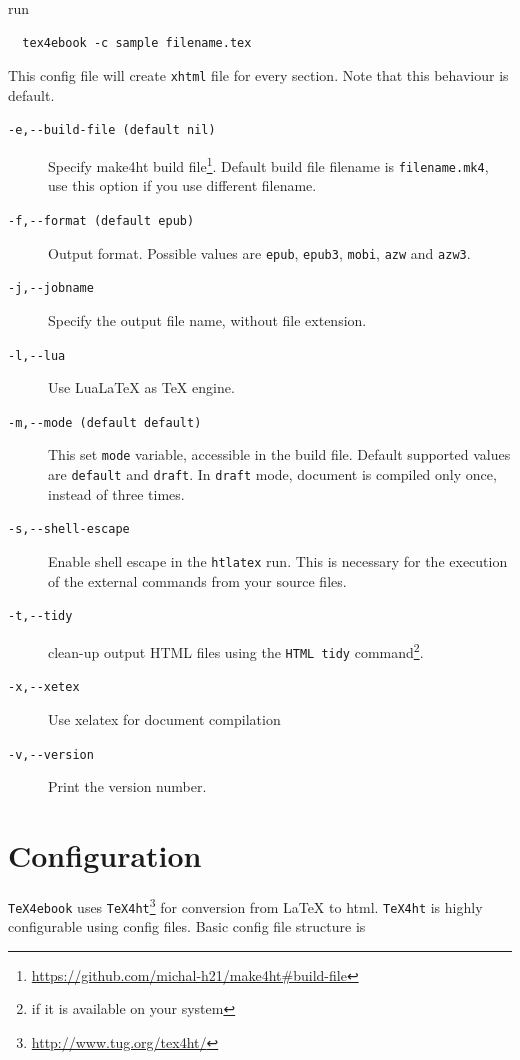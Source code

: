 run

\begin{verbatim}
  tex4ebook -c sample filename.tex
\end{verbatim}

This config file will create \texttt{xhtml} file for every section. Note
that this behaviour is default.

\begin{description}
\item[\texttt{-e,-\/-build-file\ (default\ nil)}]
Specify make4ht build file\footnote{\url{https://github.com/michal-h21/make4ht\#build-file}}.
Default build file filename is \texttt{filename.mk4}, use this option if
you use different filename.
\item[\texttt{-f,-\/-format\ (default\ epub)}]
Output format. Possible values are \texttt{epub}, \texttt{epub3},
\texttt{mobi}, \texttt{azw} and \texttt{azw3}.
\item[\texttt{-j,-\/-jobname}]
Specify the output file name, without file extension.
\item[\texttt{-l,-\/-lua}]
Use LuaLaTeX as TeX engine.
\item[\texttt{-m,-\/-mode\ (default\ default)}]
This set \texttt{mode} variable, accessible in the build file. Default
supported values are \texttt{default} and \texttt{draft}. In
\texttt{draft} mode, document is compiled only once, instead of three
times.
\item[\texttt{-s,-\/-shell-escape}]
Enable shell escape in the \texttt{htlatex} run. This is necessary for
the execution of the external commands from your source files.
\item[\texttt{-t,-\/-tidy}]
clean-up output HTML files using the \texttt{HTML\ tidy}
command\footnote{if it is available on your system}.
\item[\texttt{-x,-\/-xetex}]
Use xelatex for document compilation
\item[\texttt{-v,-\/-version}]
Print the version number.
\end{description}

\hypertarget{configuration}{%
\section{Configuration}\label{configuration}}

\texttt{TeX4ebook} uses \texttt{TeX4ht}\footnote{\url{http://www.tug.org/tex4ht/}}
for conversion from LaTeX to html. \texttt{TeX4ht} is highly
configurable using config files. Basic config file structure is

